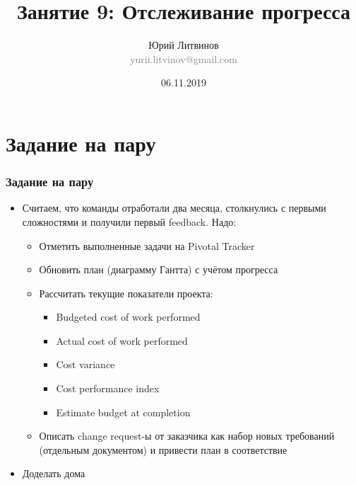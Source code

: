 \documentclass[xetex,mathserif,serif]{beamer}
\title{Занятие 9: Отслеживание прогресса}
\author[Юрий Литвинов]{Юрий Литвинов\\\small{\textcolor{gray}{yurii.litvinov@gmail.com}}}
\date{06.11.2019}
\begin{document}
	\frame{\titlepage}

	\section{Задание на пару}

	\begin{frame}
		\frametitle{Задание на пару}
		\begin{itemize}
			\item Считаем, что команды отработали два месяца, столкнулись с первыми сложностями и получили первый feedback. Надо:
			\begin{itemize}
				\item Отметить выполненные задачи на Pivotal Tracker
				\item Обновить план (диаграмму Гантта) с учётом прогресса
				\item Рассчитать текущие показатели проекта:
				\begin{itemize}
					\item Budgeted cost of work performed
					\item Actual cost of work performed
					\item Cost variance
					\item Cost performance index
					\item Estimate budget at completion
				\end{itemize}
				\item Описать change request-ы от заказчика как набор новых требований (отдельным документом) и привести план в соответствие
			\end{itemize}
			\item Доделать дома
		\end{itemize}
	\end{frame}
\end{document}
